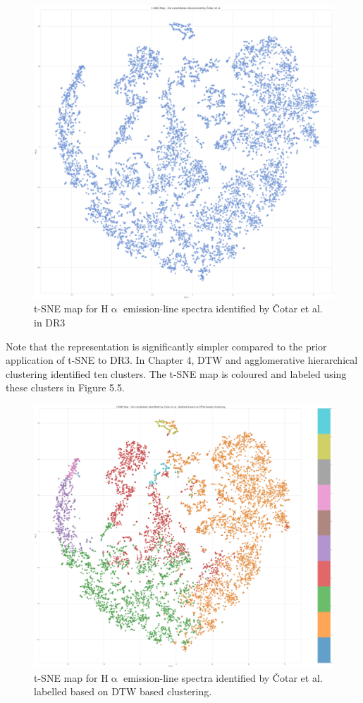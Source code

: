 \begin{figure}[h]
\centering
\includegraphics[scale=0.12]{figures/t-sne cotar et al.png}
\caption{t-SNE map for H$\upalpha$ emission-line spectra identified by Čotar et al. in DR3}
\end{figure}

Note that the representation is significantly simpler compared to the prior application of t-SNE to DR3. In Chapter 4, DTW and agglomerative hierarchical clustering identified ten clusters. The t-SNE map is coloured and labeled using these clusters in Figure 5.5.

\begin{figure}[t]
\centering
\includegraphics[scale=0.16]{figures/t-sne colored by dtw.png}
\caption{t-SNE map for H$\upalpha$ emission-line spectra identified by Čotar et al. labelled based on DTW based clustering.}
\label{fig5.5}
\end{figure}

